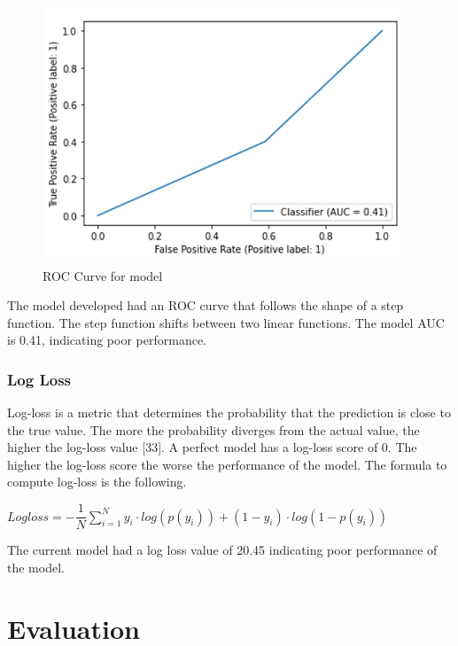 \begin{figure}[H]
    \centering
    \includegraphics[width=410px, keepaspectratio=true]{roc.png}
    \caption{ROC Curve for model}
    \label{fig:my_label}
\end{figure}

The model developed had an ROC curve that follows the shape of a step function. The step function shifts between two linear functions. The model AUC is 0.41, indicating poor performance.

\subsubsection{Log Loss}
Log-loss is a metric that determines the probability that the prediction is close to the true value. The more the probability diverges from the actual value, the higher the log-loss value [33]. A perfect model has a log-loss score of 0. The higher the log-loss score the worse the performance of the model. The formula to compute log-loss is the following.

\begin{center}
$ Log loss = -\dfrac{1}{N}\sum\limits_{i = 1}^{N}y_i\cdot log(p(y_i)) + (1-y_i)\cdot log(1-p(y_i))$
\end{center}

The current model had a log loss value of 20.45 indicating poor performance of the model.

\section{Evaluation}
